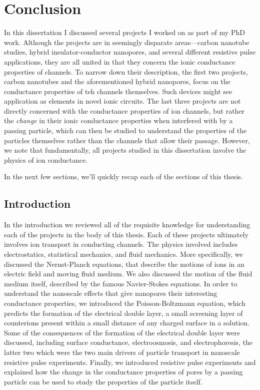 \graphicspath{{../images/ch6/}}	%


\chapter{Conclusion}
\label{chap:conclusion}

In this dissertation I discussed several projects I worked on as part of my PhD work. Although the projects are in seemingly disparate areas---carbon nanotube studies, hybrid insulator-conductor nanopores, and several different resistive pulse applications, they are all united in that they concern the ionic conductance properties of channels. To narrow down their description, the first two projects, carbon nanotubes and the aforementioned hybrid nanopores, focus on the conductance properties of teh channels themselves. Such devices might see application as elements in novel ionic circuits. The last three projects are not directly concerned with the conductance properties of ion channels, but rather the \textit{change} in their ionic conductance properties when interfered with by a passing particle, which can then be studied to understand the properties of the particles themselves rather than the channels that allow their passage. However, we note that fundamentally, all projects studied in this dissertation involve the physics of ion conductance.

In the next few sections, we'll quickly recap each of the sections of this thesis.

\section{Introduction}
	
	In the introduction we reviewed all of the requisite knowledge for understanding each of the projects in the body of this thesis. Each of these projects ultimately involves ion transport in conducting channels. The physics involved includes electrostatics, statistical mechanics, and fluid mechanics. More specifically, we discussed the Nernst-Planck equations, that describe the motions of ions in an electric field and moving fluid medium. We also discussed the motion of the fluid medium itself, described by the famous Navier-Stokes equations. In order to understand the nanoscale effects that give nanopores their interesting conductance properties, we introduced the Poisson-Boltzmann equation, which predicts the formation of the electrical double layer, a small screening layer of counterions present within a small distance of any charged surface in a solution. Some of the consequences of the formation of the electrical double layer were discussed, including surface conductance, electroosmosis, and electrophoresis, the latter two which were the two main drivers of particle transport in nanoscale resistive pulse experiments. Finally, we introduced resistive pulse experiments and explained how the change in the conductance properties of pores by a passing particle can be used to study the properties of the particle itself.

